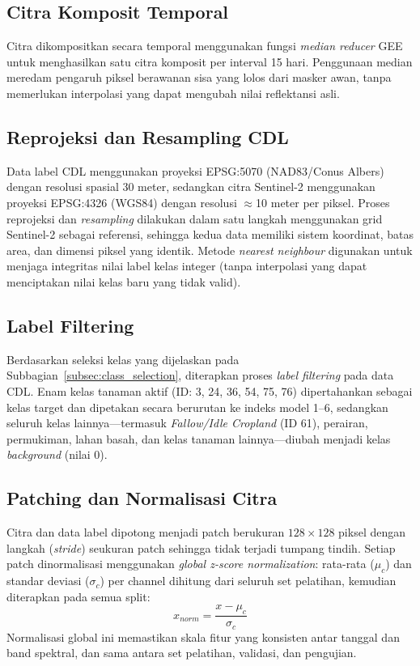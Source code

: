 \subsection{Citra Komposit Temporal}
Citra dikompositkan secara temporal menggunakan fungsi \textit{median reducer} GEE untuk menghasilkan satu citra komposit per interval 15 hari.
Penggunaan median meredam pengaruh piksel berawanan sisa yang lolos dari masker awan, tanpa memerlukan interpolasi yang dapat mengubah nilai reflektansi asli.

\subsection{Reprojeksi dan Resampling CDL}
Data label CDL menggunakan proyeksi EPSG:5070 (NAD83/Conus Albers) dengan resolusi spasial 30 meter, sedangkan citra Sentinel-2 menggunakan proyeksi EPSG:4326 (WGS84) dengan resolusi $\approx$10 meter per piksel.
Proses reprojeksi dan \textit{resampling} dilakukan dalam satu langkah menggunakan grid Sentinel-2 sebagai referensi, sehingga kedua data memiliki sistem koordinat, batas area, dan dimensi piksel yang identik.
Metode \textit{nearest neighbour} digunakan untuk menjaga integritas nilai label kelas integer (tanpa interpolasi yang dapat menciptakan nilai kelas baru yang tidak valid).

\subsection{Label Filtering}
Berdasarkan seleksi kelas yang dijelaskan pada Subbagian~\ref{subsec:class_selection}, diterapkan proses \textit{label filtering} pada data CDL.
Enam kelas tanaman aktif (ID: 3, 24, 36, 54, 75, 76) dipertahankan sebagai kelas target dan dipetakan secara berurutan ke indeks model 1--6, sedangkan seluruh kelas lainnya---termasuk \textit{Fallow/Idle Cropland} (ID 61), perairan, permukiman, lahan basah, dan kelas tanaman lainnya---diubah menjadi kelas \textit{background} (nilai 0).

\subsection{Patching dan Normalisasi Citra}
Citra dan data label dipotong menjadi patch berukuran $128\times128$ piksel dengan langkah (\textit{stride}) seukuran patch sehingga tidak terjadi tumpang tindih.
Setiap patch dinormalisasi menggunakan \textit{global z-score normalization}: rata-rata ($\mu_c$) dan standar deviasi ($\sigma_c$) per channel dihitung dari seluruh set pelatihan, kemudian diterapkan pada semua split:
\begin{equation}
    x_{norm} = \frac{x - \mu_c}{\sigma_c}
\end{equation}
Normalisasi global ini memastikan skala fitur yang konsisten antar tanggal dan band spektral, dan sama antara set pelatihan, validasi, dan pengujian.

